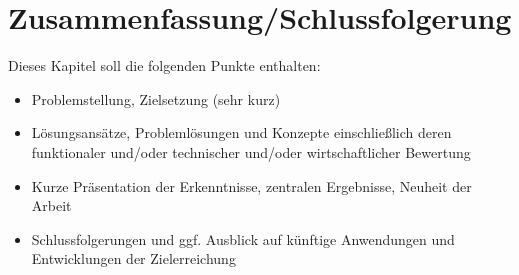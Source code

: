 \chapter{Zusammenfassung/Schlussfolgerung}
\label{sec: Zusammenfassung}

Dieses Kapitel soll die folgenden Punkte enthalten:
\begin{itemize}
	\item Problemstellung, Zielsetzung (sehr kurz)
	\item Lösungsansätze, Problemlösungen und Konzepte einschließlich deren funktionaler und/oder technischer und/oder wirtschaftlicher Bewertung
	\item Kurze Präsentation der Erkenntnisse, zentralen Ergebnisse, Neuheit der Arbeit
	\item Schlussfolgerungen und ggf. Ausblick auf künftige Anwendungen und Entwicklungen der Zielerreichung
\end{itemize}